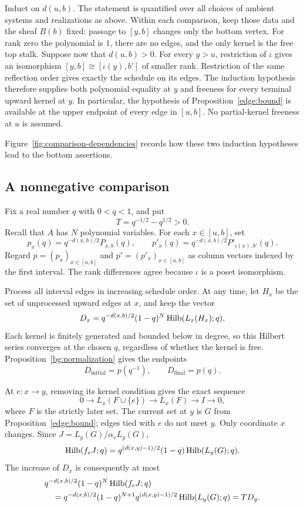 Induct on \(d(u,b)\).
The statement is quantified over all choices of ambient systems and
realizations as above. Within each comparison, keep those data and the sheaf
\(B(b)\) fixed: passage to \([y,b]\) changes only the bottom vertex.
For rank zero the polynomial is \(1\), there are no edges, and the
only kernel is the free top stalk.
Suppose now that \(d(u,b)>0\).
For every \(y>u\), restriction of \(\iota\) gives an isomorphism
\([y,b]\cong[\iota(y),b']\) of smaller rank.
Restriction of the same reflection order gives exactly the schedule
on its edges.
The induction hypothesis therefore supplies both polynomial equality
at \(y\) and freeness for every terminal upward kernel at \(y\).
In particular, the hypothesis of Proposition~\ref{edge:bound}
is available at the upper endpoint of every edge in \([u,b]\).
No partial-kernel freeness at \(u\) is assumed.

Figure~\ref{fig:comparison-dependencies} records how these two induction
hypotheses lead to the bottom assertions.


\subsection{A nonnegative comparison}
Fix a real number \(q\) with \(0<q<1\), and put
\[
 T=q^{-1/2}-q^{1/2}>0.
\]
Recall that \(A\) has \(N\) polynomial variables.
For each \(x\in[u,b]\), set
\[
 p_x(q)=q^{-d(x,b)/2}P_{x,b}(q),\qquad
 p'_x(q)=q^{-d(x,b)/2}P'_{\iota(x),b'}(q).
\]
Regard $p=(p_x)_{x\in[u,b]}$ and $p'=(p'_x)_{x\in[u,b]}$ as
column vectors indexed by the first interval. The rank differences agree
because $\iota$ is a poset isomorphism.

Process all interval edges in increasing schedule order.
At any time, let \(H_x\) be the set of unprocessed upward edges at
\(x\), and keep the vector
\begin{equation}\label{eq:state}
 D_x=q^{-d(x,b)/2}(1-q)^N\operatorname{Hilb}(L_x(H_x);q).
\end{equation}
Each kernel is finitely generated and bounded below in degree,
so this Hilbert series converges at the chosen \(q\), regardless
of whether the kernel is free.
Proposition~\ref{bg:normalization} gives the endpoints
\begin{equation}\label{eq:endpoints}
 D_{\mathrm{initial}}=p(q^{-1}),\qquad
 D_{\mathrm{final}}=p(q).
\end{equation}

At \(e:x\to y\), removing its kernel condition gives the exact sequence
\[
 0\longrightarrow L_x(F\cup\{e\})
 \longrightarrow L_x(F)\longrightarrow I\longrightarrow0,
\]
where \(F\) is the strictly later set.
The current set at \(y\) is \(G\) from Proposition~\ref{edge:bound};
edges tied with \(e\) do not meet \(y\).
Only coordinate \(x\) changes.
Since \(J=L_y(G)/\alpha_e L_y(G)\),
\[
 \operatorname{Hilb}(f_eJ;q)
 =q^{(d(x,y)-1)/2}(1-q)\operatorname{Hilb}(L_y(G);q).
\]
The increase of \(D_x\) is consequently at most
\begin{align}
 &q^{-d(x,b)/2}(1-q)^N\operatorname{Hilb}(f_eJ;q)\notag\\
 &\quad=
 q^{-d(x,b)/2}(1-q)^{N+1}
 q^{(d(x,y)-1)/2}\operatorname{Hilb}(L_y(G);q)
 =T D_y. \label{eq:step}
\end{align}

